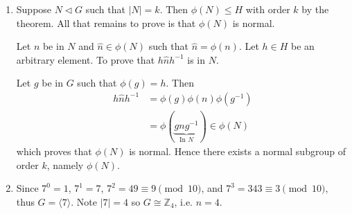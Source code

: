 \begin{enumerate}
    \item Suppose $N \lhd G$ such that $|N| = k$. Then $\phi(N) \leq H$ with order $k$ by the theorem. All that remains to prove is that $\phi(N)$ is normal.

    Let $n$ be in $N$ and $\hat{n} \in \phi(N)$ such that $\hat{n} = \phi(n)$. Let $h \in H$ be an arbitrary element. To prove that $h\hat{n}h^{-1}$ is in $N$.

    Let $g$ be in $G$ such that $\phi(g) = h$. Then
    \begin{align*}
        h\hat{n}h^{-1} &= \phi(g)\phi(n)\phi(g^{-1})\\
        &= \phi(\underbrace{gng^{-1}}_{\text{In } N})
        \in \phi(N)
    \end{align*}
    which proves that $\phi(N)$ is normal. Hence there exists a normal subgroup of order $k$, namely $\phi(N)$.

    \item Since $7^0 = 1$, $7^1 = 7$, $7^2 = 49 \equiv 9 \pmod{10}$, and $7^3 = 343 \equiv 3 \pmod{10}$, thus $G = \langle 7 \rangle$. Note $|7| = 4$ so $G \cong \mathbb{Z}_4$, i.e. $n = 4$.
\end{enumerate}

